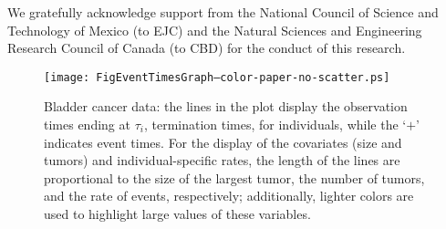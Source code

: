 \documentclass[12pt]{article}
\begin{document}
We gratefully acknowledge support from the National Council of Science and Technology of Mexico (to EJC) and the Natural Sciences and Engineering Research Council of Canada (to CBD) for the conduct of this research.
	
\clearpage







\newpage
\begin{figure}[h]
  \caption{\small{Bladder cancer data: the lines in the plot display the observation times ending at $\tau_i$, termination times, for individuals, while the `$+$' indicates event times. For the display of the covariates (size and tumors) and individual-specific rates, the length of the lines are proportional to  the size of the largest tumor, the number of tumors, and the rate of events, respectively; additionally, lighter colors are used to highlight large values of these variables.} } \label{fig:bc-event-times}
    \begin{center}
        \texttt{[image: FigEventTimesGraph--color-paper-no-scatter.ps]}
\end{center}
\end{figure}
\end{document}
